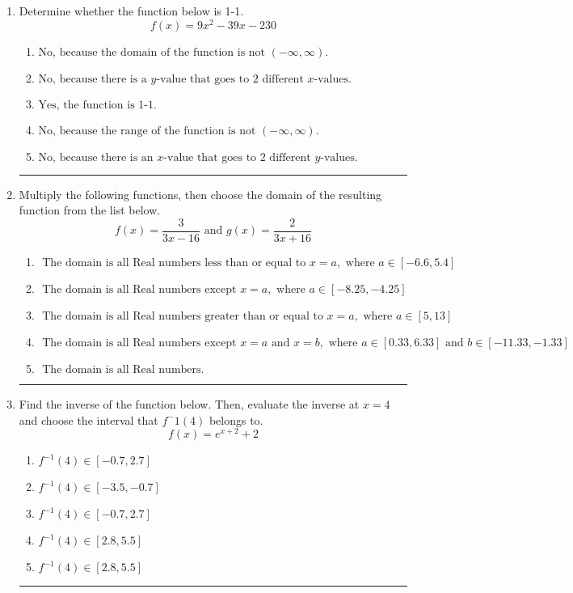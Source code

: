 \documentclass[14pt]{extbook}
\newcommand{\litem}[1]{\item#1\hspace*{-1cm}\rule{\textwidth}{0.4pt}}
\begin{document}
\begin{enumerate}
{\begin{enumerate}[label=\Alph*.]
\end{enumerate} }
\litem{
Determine whether the function below is 1-1.\[ f(x) = 9 x^2 - 39 x - 230 \]\begin{enumerate}[label=\Alph*.]
\item \( \text{No, because the domain of the function is not $(-\infty, \infty)$.} \)
\item \( \text{No, because there is a $y$-value that goes to 2 different $x$-values.} \)
\item \( \text{Yes, the function is 1-1.} \)
\item \( \text{No, because the range of the function is not $(-\infty, \infty)$.} \)
\item \( \text{No, because there is an $x$-value that goes to 2 different $y$-values.} \)

\end{enumerate} }
\litem{
Multiply the following functions, then choose the domain of the resulting function from the list below.\[ f(x) = \frac{3}{3x-16} \text{ and } g(x) = \frac{2}{3x+16} \]\begin{enumerate}[label=\Alph*.]
\item \( \text{ The domain is all Real numbers less than or equal to } x = a, \text{ where } a \in [-6.6, 5.4] \)
\item \( \text{ The domain is all Real numbers except } x = a, \text{ where } a \in [-8.25, -4.25] \)
\item \( \text{ The domain is all Real numbers greater than or equal to } x = a, \text{ where } a \in [5, 13] \)
\item \( \text{ The domain is all Real numbers except } x = a \text{ and } x = b, \text{ where } a \in [0.33, 6.33] \text{ and } b \in [-11.33, -1.33] \)
\item \( \text{ The domain is all Real numbers. } \)

\end{enumerate} }
\litem{
Find the inverse of the function below. Then, evaluate the inverse at $x = 4$ and choose the interval that $f^-1(4)$ belongs to.\[ f(x) = e^{x+2}+2 \]\begin{enumerate}[label=\Alph*.]
\item \( f^{-1}(4) \in [-0.7, 2.7] \)
\item \( f^{-1}(4) \in [-3.5, -0.7] \)
\item \( f^{-1}(4) \in [-0.7, 2.7] \)
\item \( f^{-1}(4) \in [2.8, 5.5] \)
\item \( f^{-1}(4) \in [2.8, 5.5] \)


\end{enumerate}}
\end{enumerate}
\end{document}
